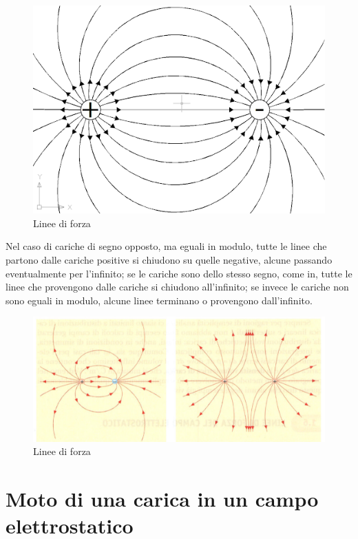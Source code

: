 \documentclass[class=book, crop=false, oneside, 12pt]{standalone}
\begin{document}
\begin{figure}[h]
    \includegraphics[scale=0.4]{linee-di-forza}
    \centering
    \caption{Linee di forza}
\end{figure}

Nel caso di cariche di segno opposto, ma eguali in modulo, tutte le linee che partono dalle cariche positive si chiudono su quelle negative, alcune passando eventualmente per l'infinito; 
se le cariche sono dello stesso segno, come in, tutte le linee che provengono dalle cariche si chiudono all'infinito; 
se invece le cariche non sono eguali in modulo, alcune linee terminano o provengono dall'infinito.

\begin{figure}[h]
    \includegraphics[scale=0.4]{linee_infinito.png}
    \centering
    \caption{Linee di forza}
\end{figure}

\section{Moto di una carica in un campo elettrostatico}
\end{document}
